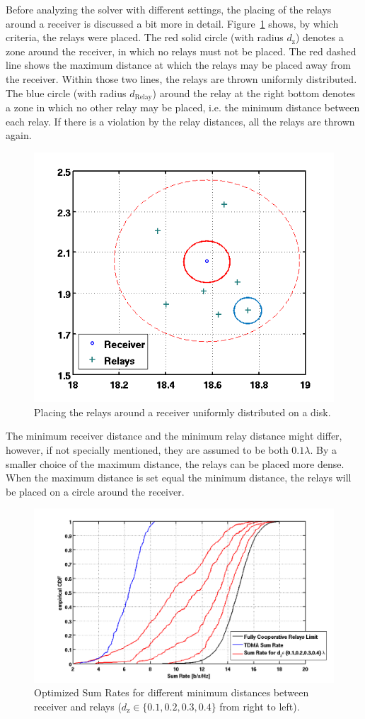 Before analyzing the solver with different settings, the placing of the relays around a receiver is discussed a bit more in detail.
Figure~\ref{fig:cloud} shows, by which criteria, the relays were placed.
The red solid circle (with radius $d_\text{z}$) denotes a zone around the receiver, in which no relays must not be placed.
The red dashed line shows the maximum distance at which the relays may be placed away from the receiver. 
Within those two lines, the relays are thrown uniformly distributed.
The blue circle (with radius $d_\text{Relay}$) around the relay at the right bottom denotes a zone in which no other relay may be placed, i.e. the minimum distance between each relay.
If there is a violation by the relay distances, all the relays are thrown again.
\begin{figure}[h]
\centering
  \includegraphics[width=0.7\linewidth]{images/cloud.png}
\caption{Placing the relays around a receiver uniformly distributed on a disk.}
\label{fig:cloud}
\end{figure}

The minimum receiver distance and the minimum relay distance might differ, however, if not specially mentioned, they are assumed to be both $0.1\lambda$.
By a smaller choice of the maximum distance, the relays can be placed more dense.
When the maximum distance is set equal the minimum distance, the relays will be placed on a circle around the receiver.
\begin{figure}[h]
\centering
  \includegraphics[width=0.9\linewidth]{images/Dzcomparison.png}
\caption{Optimized Sum Rates for different minimum distances between receiver and relays ($d_\text{z}\in\{0.1,0.2,0.3,0.4\}$ from right to left).}
\label{fig:dz_comparison}
\end{figure}

